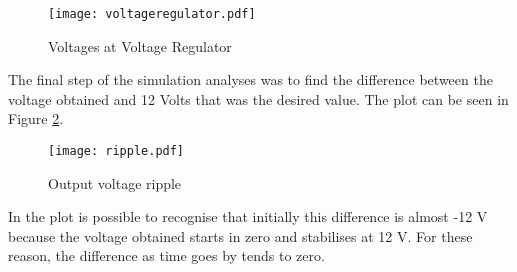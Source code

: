\begin{figure}[h] \centering
\texttt{[image: voltageregulator.pdf]}
\caption{Voltages at Voltage Regulator}
\label{fig:voltageregulator}
\end{figure}


\newpage


The final step of the simulation analyses was to find the difference between the voltage obtained and 12 Volts that was the desired value. The plot can be seen in Figure \ref{fig:ripple}.

\begin{figure}[h] \centering
\texttt{[image: ripple.pdf]}\caption{Output voltage ripple}
\label{fig:ripple}
\end{figure}




In the plot is possible to recognise that initially this difference is almost -12 V because the voltage obtained starts in zero and stabilises at 12 V. For these reason, the difference as time goes by tends to zero.




